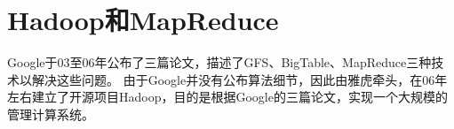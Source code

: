\section{Hadoop和MapReduce}
Google于03至06年公布了三篇论文，描述了GFS、BigTable、MapReduce三种技术以解决这些问题\parencite{Dean2004MapReduce,Ghemawat2003The,Chang2008Bigtable}。
由于Google并没有公布算法细节，因此由雅虎牵头，在06年左右建立了开源项目Hadoop，目的是根据Google的三篇论文，实现一个大规模的管理计算系统。

